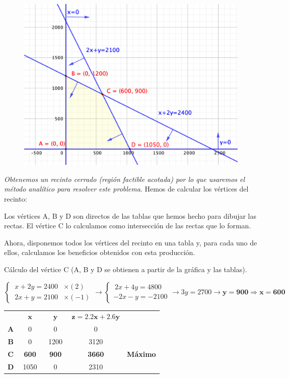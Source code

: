 \begin{figure}[H]
	\centering
	\includegraphics[width=.75\textwidth]{imagenes/img23b.png}
\end{figure}

\emph{Obtenemos un recinto cerrado (región factible acotada) por lo que usaremos el método analítico para resolver este problema}. Hemos de calcular los vértices del recinto:

Los vértices A, B y D son directos de las tablas que hemos hecho para dibujar las rectas. El vértice C lo calculamos como intersección de las rectas que lo forman.

Ahora, disponemos todos los vértices del recinto en una tabla y, para cada uno de ellos, calculamos los beneficios obtenidos con esta producción. 

Cálculo del vértice C (A, B y D se obtienen a partir de la  gráfica y las tablas).

$\begin{cases}
\ x+2y=2400 & \times (2)	 \\
\ 2x+y=2100 & \times (-1)
\end{cases} \to
\begin{cases}
\ 2x+4y=4800 \\ -2x-y=-2100	
\end{cases} \to 3y=2700 \to \boldsymbol{y=900} \Rightarrow \boldsymbol{x=600}$


\begin{table}[H]
\centering
\begin{tabular}{cc|c|cl}
 & $\quad \boldsymbol{x} \quad$ & $\quad \boldsymbol{y} \quad$ & $\boldsymbol{z=2.2x+2.6y}$ &  \\ \cline{2-4}
\multicolumn{1}{c|}{\textbf{A}} & 0 & 0 & \multicolumn{1}{c|}{0} &  \\ \cline{1-4}
\multicolumn{1}{c|}{\textbf{B}} & 0 & 1200 & \multicolumn{1}{c|}{3120} &  \\ \cline{1-4}
\multicolumn{1}{c|}{\textbf{C}} & \textbf{600} & \textbf{900} & \multicolumn{1}{c|}{\textbf{3660}} & \textbf{Máximo} \\ \cline{1-4}
\multicolumn{1}{c|}{\textbf{D}} & 1050 & 0 & \multicolumn{1}{c|}{2310} &  \\ \cline{2-4}
\end{tabular}
\end{table}

